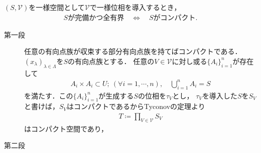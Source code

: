 	\begin{screen}
		\begin{thm}
			$(S,\mathscr{V})$を一様空間として$\mathscr{V}$で一様位相を導入するとき，
			\begin{align}
				\mbox{$S$が完備かつ全有界} \quad \Longleftrightarrow \quad
				\mbox{$S$がコンパクト}.
			\end{align}
		\end{thm}
	\end{screen}
	
	\begin{prf}\mbox{}
		\begin{description}
			\item[第一段]
				任意の有向点族が収束する部分有向点族を持てばコンパクトである．
				$(x_\lambda)_{\lambda \in \Lambda}$を$S$の有向点族とする．
				任意の$V \in \mathscr{V}$に対し或る$\{A_i\}_{i=1}^n$が存在して
				\begin{align}
					A_i \times A_i \subset U;\ (\forall i=1,\cdots,n),\quad
					\bigcup_{i=1}^n A_i = S
				\end{align}
				を満たす．この$\{A_i\}_{i=1}^n$が生成する$S$の位相を$\tau_V$とし，
				$\tau_V$を導入した$S$を$S_V$と書けば，$S_V$はコンパクトであるからTyconovの定理より
				\begin{align}
					T \coloneqq \prod_{V \in \mathscr{V}} S_V
				\end{align}
				はコンパクト空間であり，
			\item[第二段]
		\end{description}
	\end{prf}